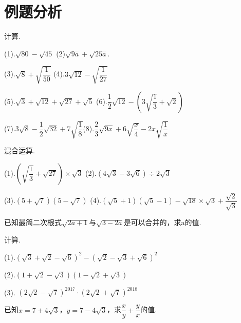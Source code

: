 \section{例题分析}
\begin{example}计算.\par
    (1).$\sqrt{80}-\sqrt{45}$ \hfil (2)$\sqrt{9 a}+\sqrt{25 a}$.\par
    \vspace{2cm}
    (3).$\sqrt{8}+\sqrt{\dfrac{1}{50}}$ \hfil (4).$3 \sqrt{12}-\sqrt{\dfrac{1}{27}}$\par
    \vspace{2cm}
    (5).$\sqrt{3}+\sqrt{12}+\sqrt{27}+\sqrt{5}$ \hfil (6).$\dfrac{1}{2} \sqrt{12}-\left(3 \sqrt{\dfrac{1}{3}}+\sqrt{2}\right)$\par
    \vspace{2cm}
    (7).$3 \sqrt{8}-\dfrac{1}{2} \sqrt{32}+7 \sqrt{\dfrac{1}{8}}$\hfil (8).$\dfrac{2}{3} \sqrt{9 x}+6 \sqrt{\dfrac{x}{4}}-2 x \sqrt{\dfrac{1}{x}}$
\vspace{2cm}
\end{example}
\begin{example}混合运算.\par
    (1).$\left(\sqrt{\dfrac{1}{3}}+\sqrt{27}\right) \times \sqrt{3}$ \hfil (2).$(4 \sqrt{3}-3 \sqrt{6}) \div 2 \sqrt{3}$ \par
    \vspace{2cm}
    (3).$(5+\sqrt{7})(5-\sqrt{7})$ \hfil (4).$(\sqrt{5}+1)(\sqrt{5}-1)-\sqrt{18} \times \sqrt{3}+\dfrac{\sqrt{2}}{\sqrt{3}}$
\vspace{2cm}   
\end{example}
\begin{example}
    已知最简二次根式$\sqrt{2 a+1}$与$\sqrt{3-2 a}$是可以合并的，求a的值.
\end{example}
\vspace{2cm}
\begin{example}计算.\par
    (1).$(\sqrt{3}+\sqrt{2}-\sqrt{6})^{2}-(\sqrt{2}-\sqrt{3}+\sqrt{6})^{2}$\par
    \vspace{2cm}
    (2).$(1+\sqrt{2}-\sqrt{3})(1-\sqrt{2}+\sqrt{3})$   \par
  \vspace{2cm}
    (3). $(2 \sqrt{2}-\sqrt{7})^{2017} \cdot(2 \sqrt{2}+\sqrt{7})^{2018}$
\end{example}
\vspace{2cm}
\begin{example}
    已知$x=7+4 \sqrt{3}$，$y=7-4 \sqrt{3}$，求$\dfrac{x}{y}+\dfrac{y}{x}$的值.
\end{example}
